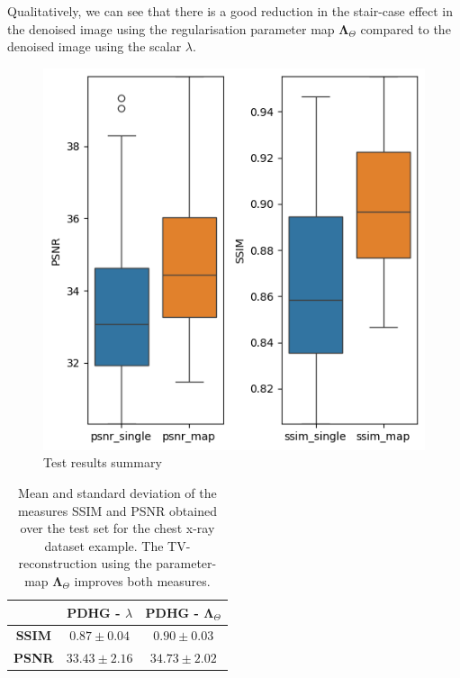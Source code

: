 \documentclass[12pt]{article}
\begin{document}
Qualitatively, we can see that there is a good reduction in the stair-case effect in the denoised image using the regularisation parameter map $\mathbf{\Lambda}_\Theta$ compared to the denoised image using the scalar $\lambda$.

\newpage








\begin{figure}[ht]
  \centering
  \includegraphics[width=0.5\linewidth]{images//chest_xray/box_plots_1.png}
  \caption{Test results summary}
  \label{fig:box_plots}
\end{figure}


\begin{table}[h!]

\centering
\begin{tabular}{c|c c}
 & \textbf{PDHG -} $\lambda$ & \textbf{PDHG -} $\mathbf{\Lambda}_{\Theta}$ \\
\hline
\textbf{SSIM} & $0.87 \pm 0.04$ & $\mathbf{0.90} \pm 0.03$ \\
\textbf{PSNR} & $33.43 \pm 2.16$ & $\mathbf{34.73} \pm 2.02$ \\
\end{tabular}

\caption{Mean and standard deviation of the measures SSIM and PSNR obtained over the test set for the chest x-ray dataset example. 
The TV-reconstruction using the parameter-map $\mathbf{\Lambda}_{\Theta}$ improves both measures.
}

\label{table:1}

\end{table}
\end{document}
